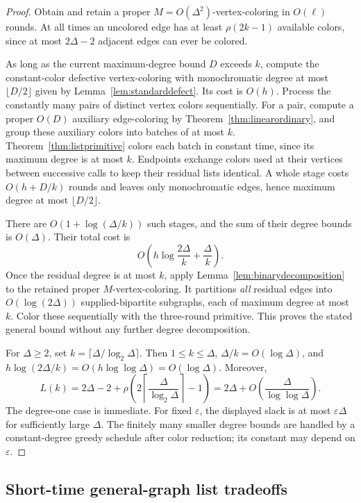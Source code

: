 \documentclass[11pt]{article}
\theoremstyle{definition}
\theoremstyle{remark}
\begin{document}
\begin{proof}
Obtain and retain a proper $M=O(\Delta^2)$-vertex-coloring in
$O(\ell)$ rounds.  At all times an uncolored edge has at least
$\rho(2k-1)$ available colors, since at most $2\Delta-2$ adjacent
edges can ever be colored.

As long as the current maximum-degree bound $D$ exceeds $k$, compute
the constant-color defective vertex-coloring with monochromatic
degree at most $\lfloor D/2\rfloor$ given by
Lemma~\ref{lem:standarddefect}.  Its cost is $O(h)$.
Process the constantly many pairs of distinct vertex colors
sequentially.  For a pair, compute a proper $O(D)$ auxiliary
edge-coloring by Theorem~\ref{thm:linearordinary}, and group these
auxiliary colors into batches of at most $k$.  Theorem~\ref{thm:listprimitive}
colors each batch in constant time, since its maximum degree is at
most $k$.  Endpoints exchange colors used at their vertices between
successive calls to keep their residual lists identical.  A whole
stage costs $O(h+D/k)$ rounds and leaves only monochromatic edges,
hence maximum degree at most $\lfloor D/2\rfloor$.

There are $O(1+\log(\Delta/k))$ such stages, and the sum of their
degree bounds is $O(\Delta)$.  Their total cost is
\[
 O\left(h\log\frac{2\Delta}{k}+\frac{\Delta}{k}\right).
\]
Once the residual degree is at most $k$, apply
Lemma~\ref{lem:binarydecomposition} to the retained proper
$M$-vertex-coloring.  It partitions \emph{all} residual edges into
$O(\log(2\Delta))$ supplied-bipartite subgraphs, each of maximum degree
at most $k$.  Color these sequentially with the three-round primitive.
This proves the stated general bound without any further degree
decomposition.

For $\Delta\ge2$, set
$k=\lceil\Delta/\log_2\Delta\rceil$.  Then $1\le k\le\Delta$,
$\Delta/k=O(\log\Delta)$, and
$h\log(2\Delta/k)=O(h\log\log\Delta)=O(\log\Delta)$.
Moreover,
\[
 L(k)=2\Delta-2+
 \rho\left(2\left\lceil\frac{\Delta}{\log_2\Delta}\right\rceil-1\right)
 =2\Delta+O\!\left(\frac{\Delta}{\log\log\Delta}\right).
\]
The degree-one case is immediate.  For fixed $\varepsilon$, the
displayed slack is at most $\varepsilon\Delta$ for sufficiently large
$\Delta$.  The finitely many smaller degree bounds are handled by a
constant-degree greedy schedule after color reduction; its constant
may depend on $\varepsilon$.
\end{proof}

\subsection{Short-time general-graph list tradeoffs}
\end{document}
